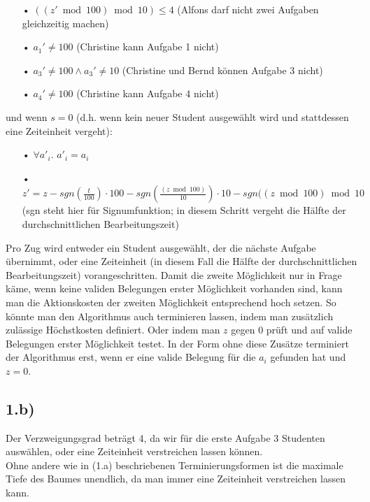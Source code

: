\documentclass[a4paper]{article}
\begin{document}
\begin{itemize}
\begin{itemize}
    	\item[•] $((z' \bmod 100) \bmod 10)\leq 4$ \qquad (Alfons darf nicht zwei Aufgaben gleichzeitig machen)  	
  	
    	\item[•] $a_1' \neq 100$ \qquad (Christine kann Aufgabe 1 nicht)
    	
    	\item[•] $a_3' \neq 100 \wedge a_3' \neq 10$ \qquad (Christine und Bernd können Aufgabe 3 nicht)
    	
    	\item[•] $a_4' \neq 100$ \qquad (Christine kann Aufgabe 4 nicht)
    	\end{itemize}
    und wenn $s = 0$ (d.h. wenn kein neuer Student ausgewählt wird und stattdessen eine Zeiteinheit vergeht):
    	\begin{itemize}%
    	
    	\item[•] $\forall a'_i$. $a'_i=a_i$
    	
    	\item[•] $z' = z-sgn(\frac{t}{100})\cdot 100-sgn(\frac{(z \bmod 100)}{10})\cdot 10 - sgn((z \bmod 100) \bmod 10$ \qquad (sgn steht hier für Signumfunktion; in diesem Schritt vergeht die Hälfte der durchschnittlichen Bearbeitungszeit)
    	\end{itemize}
    \end{itemize}
    
Pro Zug wird entweder ein Student ausgewählt, der die nächste Aufgabe übernimmt, oder eine Zeiteinheit (in diesem Fall die Hälfte der durchschnittlichen Bearbeitungszeit) vorangeschritten. Damit die zweite Möglichkeit nur in Frage käme, wenn keine validen Belegungen erster Möglichkeit vorhanden sind, kann man die Aktionskosten der zweiten Möglichkeit entsprechend hoch setzen. So könnte man den Algorithmus auch terminieren lassen, indem man zusätzlich zulässige Höchstkosten definiert. Oder indem man $z$ gegen $0$ prüft und auf valide Belegungen erster Möglichkeit testet. In der Form ohne diese Zusätze terminiert der Algorithmus erst, wenn er eine valide Belegung für die $a_i$ gefunden hat und $z=0$.

\subsection*{1.b)}   
Der Verzweigungsgrad beträgt 4, da wir für die erste Aufgabe 3 Studenten auswählen, oder eine Zeiteinheit verstreichen lassen können.\\
Ohne andere wie in (1.a) beschriebenen Terminierungsformen ist die maximale Tiefe des Baumes unendlich, da man immer eine Zeiteinheit verstreichen lassen kann.
    
\end{document}
